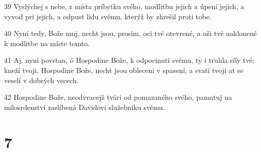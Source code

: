 \par 39 Vyslýchej s nebe, z místa príbytku svého, modlitbu jejich a úpení jejich, a vyvod pri jejich, a odpust lidu svému, kterýž by zhrešil proti tobe.
\par 40 Nyní tedy, Bože muj, necht jsou, prosím, oci tvé otevrené, a uši tvé naklonené k modlitbe na míste tomto.
\par 41 Aj, nyní povstan, ó Hospodine Bože, k odpocinutí svému, ty i truhla síly tvé; kneží tvoji, Hospodine Bože, necht jsou obleceni v spasení, a svatí tvoji at se veselí v dobrých vecech.
\par 42 Hospodine Bože, neodvracejž tvári od pomazaného svého, pamatuj na milosrdenství zaslíbená Davidovi služebníku svému.

\chapter{7}

